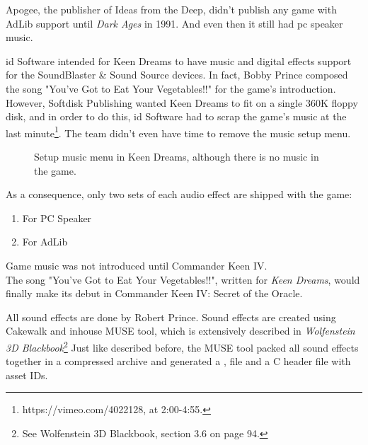 \documentclass[book.tex]{subfiles}
\begin{document}
\par
{} Apogee, the publisher of Ideas from the Deep, didn't publish any game with AdLib support until \textit{Dark Ages} in 1991. And even then it still had pc speaker music.\\

\par
id Software intended for Keen Dreams to have music and digital effects support for the SoundBlaster \& Sound Source devices. In fact, Bobby Prince composed the song "You've Got to Eat Your Vegetables!!" for the game's introduction. However, Softdisk Publishing wanted Keen Dreams to fit on a single 360K floppy disk, and in order to do this, id Software had to scrap the game's music at the last minute\footnote{https://vimeo.com/4022128, at 2:00-4:55.}. The team didn't even have time to remove the music setup menu.\\

\par
\par
\begin{figure}[H]
\centering
{}
\caption{Setup music menu in Keen Dreams, although there is no music in the game.}
\end{figure}
\par

\pagebreak

As a consequence, only two sets of each audio effect are shipped with the game:
\begin{enumerate}
\item For PC Speaker
\item For AdLib
\end{enumerate}

Game music was not introduced until Commander Keen IV.  \\

 The song "You've Got to Eat Your Vegetables!!", written for \textit{Keen Dreams}, would finally make its debut in Commander Keen IV: Secret of the Oracle.\\


\par
All sound effects are done by Robert Prince. Sound effects are created using Cakewalk and inhouse MUSE tool, which is  extensively described in \textit{Wolfenstein 3D Blackbook}\footnote{See Wolfenstein 3D Blackbook, section 3.6 on page 94.}
Just like described before, the MUSE tool packed all sound effects together in a compressed  archive and generated a ,  file and a C header file with asset IDs.\\
\end{document}
